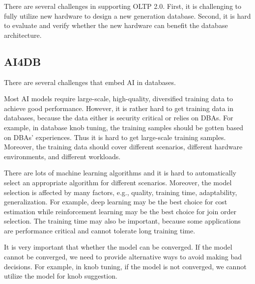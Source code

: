 There are several challenges in supporting OLTP 2.0. First, it is challenging to fully utilize new hardware to design a new generation database. Second, it is hard to evaluate and verify whether the new hardware can benefit the database architecture. 








\subsection{AI4DB}

There are several challenges that embed AI in databases. 

 Most AI models require large-scale, high-quality, diversified training data to achieve good performance. However, it is rather hard to get training data in databases, because the data either is security critical or relies on DBAs. For example, in database knob tuning, the training samples should be gotten based on DBAs' experiences. Thus it is hard to get large-scale training samples. Moreover, the training data should cover different scenarios, different hardware environments, and different workloads.  


 There are lots of machine learning algorithms and it is hard to automatically select an appropriate algorithm for different scenarios. Moreover, the model selection is affected by many factors, e.g., quality, training time, adaptability, generalization. For example, deep learning may be the best choice for cost estimation while reinforcement learning may be the best choice for join order selection. The training time may also be important, because some applications are performance critical and cannot tolerate long training time. 


 It is very important that whether the model can be converged. If the model cannot be converged, we need to provide alternative ways to avoid making bad decisions. For example, in knob tuning, if the model is not converged, we cannot utilize the model for knob suggestion.   
 
